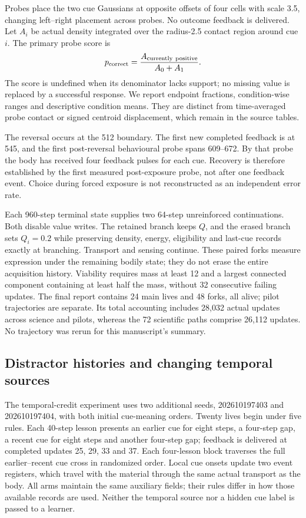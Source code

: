 Probes place the two cue Gaussians at opposite offsets of four cells with scale 3.5, changing left--right placement across probes. No outcome feedback is delivered. Let $A_i$ be actual density integrated over the radius-2.5 contact region around cue $i$. The primary probe score is
\begin{equation}
p_{\rm correct}=\frac{A_{\rm currently\ positive}}{A_0+A_1}.
\end{equation}
The score is undefined when its denominator lacks support; no missing value is replaced by a successful response. We report endpoint fractions, condition-wise ranges and descriptive condition means. They are distinct from time-averaged probe contact or signed centroid displacement, which remain in the source tables.

The reversal occurs at the 512 boundary. The first new completed feedback is at 545, and the first post-reversal behavioural probe spans 609--672. By that probe the body has received four feedback pulses for each cue. Recovery is therefore established by the first measured post-exposure probe, not after one feedback event. Choice during forced exposure is not reconstructed as an independent error rate.

Each 960-step terminal state supplies two 64-step unreinforced continuations. Both disable value writes. The retained branch keeps $Q$, and the erased branch sets $Q_i=0.2$ while preserving density, energy, eligibility and last-cue records exactly at branching. Transport and sensing continue. These paired forks measure expression under the remaining bodily state; they do not erase the entire acquisition history. Viability requires mass at least 12 and a largest connected component containing at least half the mass, without 32 consecutive failing updates. The final report contains 24 main lives and 48 forks, all alive; pilot trajectories are separate. Its total accounting includes 28,032 actual updates across science and pilots, whereas the 72 scientific paths comprise 26,112 updates. No trajectory was rerun for this manuscript's summary.

\subsection*{Distractor histories and changing temporal sources}

The temporal-credit experiment uses two additional seeds, 202610197403 and 202610197404, with both initial cue-meaning orders. Twenty lives begin under five rules. Each 40-step lesson presents an earlier cue for eight steps, a four-step gap, a recent cue for eight steps and another four-step gap; feedback is delivered at completed updates 25, 29, 33 and 37. Each four-lesson block traverses the full earlier--recent cue cross in randomized order. Local cue onsets update two event registers, which travel with the material through the same actual transport as the body. All arms maintain the same auxiliary fields; their rules differ in how those available records are used. Neither the temporal source nor a hidden cue label is passed to a learner.

